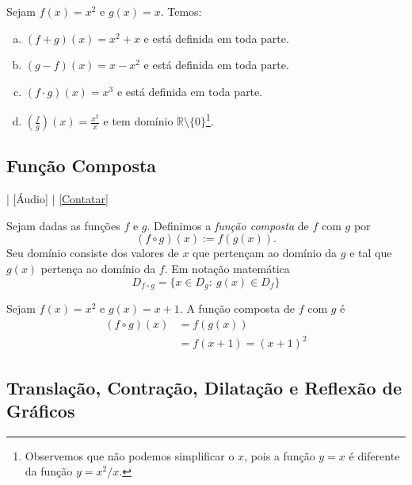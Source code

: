 \begin{ex}
  Sejam $f(x)=x^2$ e $g(x)=x$. Temos:
  \begin{enumerate}[a)]
  \item $(f+g)(x) = x^2 + x$ e está definida em toda parte.
  \item $(g-f)(x) = x - x^2$ e está definida em toda parte.
  \item $(f\cdot g)(x) = x^3$ e está definida em toda parte.
  \item $\displaystyle \left(\frac{f}{g}\right)(x) = \frac{x^2}{x}$ e tem domínio $\mathbb{R}\setminus \{0\}$\footnote{Observemos que não podemos simplificar o $x$, pois a função $y=x$ é diferente da função $y=x^2/x$.}.
  \end{enumerate}
\end{ex}

\subsection{Função Composta}

\begin{flushright}
  [Vídeo] | [Áudio] | \href{https://phkonzen.github.io/notas/contato.html}{[Contatar]}
\end{flushright}

Sejam dadas as funções $f$ e $g$. Definimos a \emph{função composta} de $f$ com $g$ por
\begin{equation}
  (f\circ g)(x) := f\left(g(x)\right).
\end{equation}
Seu domínio consiste dos valores de $x$ que pertençam ao domínio da $g$ e tal que $g(x)$ pertença ao domínio da $f$. Em notação matemática
\begin{equation}
  D_{f\circ g} = \{x\in D_g:~g(x)\in D_f\}
\end{equation}

\begin{ex}
  Sejam $f(x) = x^2$ e $g(x) = x+1$. A função composta de $f$ com $g$ é
  \begin{align}
    (f\circ g)(x) &= f\left(g(x)\right)\\
                  &= f(x+1) = (x+1)^2
  \end{align}
\end{ex}

\subsection{Translação, Contração, Dilatação e Reflexão de Gráficos}

